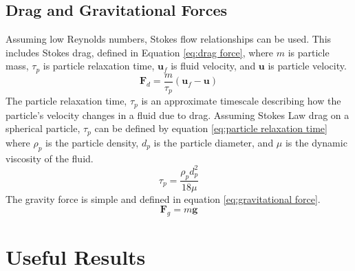 \documentclass[10pt,a4paper,titlepage]{report}
\begin{document}
\subsection{Drag and Gravitational Forces}
\label{sec:drag and gravity}
Assuming low Reynolds numbers, Stokes flow relationships can be used. This includes Stokes drag, defined in Equation \ref{eq:drag force}, where $m$ is particle mass, $\tau_p$ is particle relaxation time, $\mathbf{u}_f$ is fluid velocity, and $\mathbf{u}$ is particle velocity.
\begin{equation}
\label{eq:drag force}
\mathbf{F}_{d} = \dfrac{m}{\tau_p} (\mathbf{u}_f - \mathbf{u})
\end{equation}
The particle relaxation time, $\tau_p$ is an approximate timescale describing how the particle's velocity changes in a fluid due to drag. Assuming Stokes Law drag on a spherical particle, $\tau_p$ can be defined by equation \ref{eq:particle relaxation time} where $\rho_p$ is the particle density, $d_p$ is the particle diameter, and $\mu$ is the dynamic viscosity of the fluid.
\begin{equation}
\label{eq:particle relaxation time}
\tau_{p} = \dfrac{\rho_{p} d^{2}_{p}}{18 \mu}
\end{equation}
The gravity force is simple and defined in equation \ref{eq:gravitational force}.
\begin{equation}
\label{eq:gravitational force}
\mathbf{F}_{g} = m \mathbf{g}
\end{equation}
\section{Useful Results}
\end{document}
